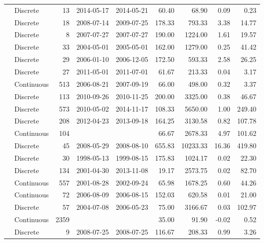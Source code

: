 \begin{table}[ht]
\begin{tabular}{llrllrrrr}
  \citet{Gonnelli2016} & Discrete &  13 & 2014-05-17 & 2014-05-21 & 60.40 & 68.90 & 0.09 & 0.23 \\ 
  \citet{Griffin2011} & Discrete &  18 & 2008-07-14 & 2009-07-25 & 178.33 & 793.33 & 3.38 & 14.77 \\ 
  \citet{Gueguen2011} & Discrete &   8 & 2007-07-27 & 2007-07-27 & 190.00 & 1224.00 & 1.61 & 19.57 \\ 
  \citet{Helms2008} & Discrete &  33 & 2004-05-01 & 2005-05-01 & 162.00 & 1279.00 & 0.25 & 41.42 \\ 
  \citet{Hernes2008} & Discrete &  29 & 2006-01-10 & 2006-12-05 & 172.50 & 593.33 & 2.58 & 26.25 \\ 
  \citet{Hur2014} & Discrete &  27 & 2011-05-01 & 2011-07-01 & 61.67 & 213.33 & 0.04 & 3.17 \\ 
  \citet{kattegat} & Continuous & 513 & 2006-08-21 & 2007-09-19 & 66.00 & 498.00 & 0.32 & 3.37 \\ 
  \citet{Kellerman2015} & Discrete & 113 & 2010-09-26 & 2010-11-25 & 200.00 & 3325.00 & 0.38 & 46.67 \\ 
  \citet{Lambert2015a} & Discrete & 573 & 2010-05-02 & 2014-11-17 & 108.33 & 5650.00 & 1.00 & 249.40 \\ 
  \citet{Loken2016} & Discrete & 208 & 2012-04-23 & 2013-09-18 & 164.25 & 3130.58 & 0.82 & 107.78 \\ 
  \citet{lter2004} & Continuous & 104 &  &  & 66.67 & 2678.33 & 4.97 & 101.62 \\ 
  \citet{lter2008} & Discrete &  45 & 2008-05-29 & 2008-08-10 & 655.83 & 10233.33 & 16.36 & 419.80 \\ 
  \citet{lter5653} & Discrete &  30 & 1998-05-13 & 1999-08-15 & 175.83 & 1024.17 & 0.02 & 22.30 \\ 
  \citet{lter5689} & Discrete & 134 & 2001-04-30 & 2013-11-08 & 19.17 & 2573.75 & 0.02 & 82.70 \\ 
  \citet{Markager2011} & Continuous & 557 & 2001-08-28 & 2002-09-24 & 65.98 & 1678.25 & 0.60 & 44.26 \\ 
  \citet{Massicotte2011EA} & Continuous &  72 & 2006-08-09 & 2006-08-15 & 152.03 & 620.58 & 0.01 & 21.00 \\ 
  \citet{Moran2006} & Discrete &  57 & 2004-07-08 & 2006-05-23 & 75.00 & 3166.67 & 0.03 & 102.97 \\ 
  \citet{Nelson2002, Nelson2007, Nelson2010} & Continuous & 2359 &  &  & 35.00 & 91.90 & -0.02 & 0.52 \\ 
  \citet{Nguyen2010} & Discrete &   9 & 2008-07-25 & 2008-07-25 & 116.67 & 208.33 & 0.99 & 3.26 \\ 

\end{tabular}
\end{table}
